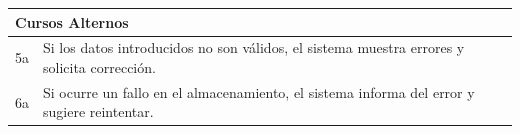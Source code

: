    \begin{table}[H]
        \begin{tabular}{llllllll}
        \hline
        \multicolumn{8}{|l|}{\cellcolor[HTML]{F2F2F2}Cursos Alternos}                                                                                                                                                                                                                                                                                \\ \hline
        \multicolumn{1}{|c|}{5a} & \multicolumn{7}{p{15cm}|}{{\color[HTML]{808080} Si los datos introducidos no son válidos, el sistema muestra errores y solicita corrección.}}                                                                                                                                      \\ \hline
        \multicolumn{1}{|c|}{6a} & \multicolumn{7}{p{15cm}|}{{\color[HTML]{808080} Si ocurre un fallo en el almacenamiento, el sistema informa del error y sugiere reintentar.}}                                                                                                                                      \\ \hline
        \end{tabular}
    \end{table}

